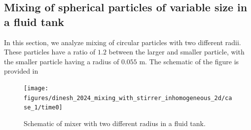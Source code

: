 \documentclass[preprint,12pt]{elsarticle}
\begin{document}
\FloatBarrier%
\subsection{Mixing of spherical particles of variable size in a fluid tank}
\label{sec:mixing-spherical-particles-in-fluid-tank-inhomogeneous}
In this section, we analyze mixing of circular
particles with two different radii. These particles have a ratio of $1.2$
between the larger and smaller particle, with the smaller particle having a
radius of $0.055$ m. The schematic of the figure is provided in
\begin{figure}[!htpb]
  \centering
  \texttt{[image: figures/dinesh\_2024\_mixing\_with\_stirrer\_inhomogeneous\_2d/case\_1/time0]}
  \caption{Schematic of mixer with two different radius in a fluid
    tank.}\label{fig:schematic-Dinesh-mixer-inhomogeneous}
\end{figure}
\end{document}
